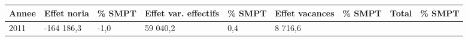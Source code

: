 \begin{longtable}[]{@{}lllllllll@{}}
\toprule
\begin{minipage}[b]{0.05\columnwidth}\raggedright
Annee\strut
\end{minipage} & \begin{minipage}[b]{0.10\columnwidth}\raggedright
Effet noria\strut
\end{minipage} & \begin{minipage}[b]{0.06\columnwidth}\raggedright
\% SMPT\strut
\end{minipage} & \begin{minipage}[b]{0.16\columnwidth}\raggedright
Effet var. effectifs\strut
\end{minipage} & \begin{minipage}[b]{0.06\columnwidth}\raggedright
\% SMPT\strut
\end{minipage} & \begin{minipage}[b]{0.12\columnwidth}\raggedright
Effet vacances\strut
\end{minipage} & \begin{minipage}[b]{0.06\columnwidth}\raggedright
\% SMPT\strut
\end{minipage} & \begin{minipage}[b]{0.10\columnwidth}\raggedright
Total\strut
\end{minipage} & \begin{minipage}[b]{0.06\columnwidth}\raggedright
\% SMPT\strut
\end{minipage}\tabularnewline
\midrule
\endhead
\begin{minipage}[t]{0.05\columnwidth}\raggedright
2011\strut
\end{minipage} & \begin{minipage}[t]{0.10\columnwidth}\raggedright
-164 186,3\strut
\end{minipage} & \begin{minipage}[t]{0.06\columnwidth}\raggedright
-1,0\strut
\end{minipage} & \begin{minipage}[t]{0.16\columnwidth}\raggedright
59 040,2\strut
\end{minipage} & \begin{minipage}[t]{0.06\columnwidth}\raggedright
0,4\strut
\end{minipage} & \begin{minipage}[t]{0.12\columnwidth}\raggedright
8 716,6\strut
\end{minipage} & \begin{minipage}[t]{0.06\columnwidth}\raggedright

\end{minipage}
\end{longtable}
